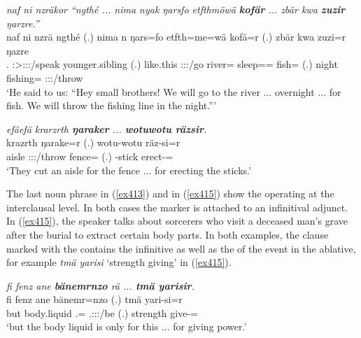 \begin{exe}
	\ex \emph{naf ni nzräkor ``ngthé ... nima nyak ŋarsfo etfthmöwä \textbf{kofär} ... zbär kwa \textbf{zuzir} ŋarzre.''}\\
	\gll naf ni nzrä ngthé (.) nima n ŋars=fo etfth=me=wä kofä=r (.) zbär kwa zuzi=r ŋazre\\
	\Tsg.{\Erg} {\Fnsg} \Stsg:\Sbj>\Fpl:\Obj:\Irr:\Pfv/speak younger.sibling (.) {like.this} \Fpl:\Sbj:\Nonpast:\Ipfv/go river={\All} sleep=\Ins={\Emph} fish={\Purp} (.) night {\Fut} fishing={\Purp} \Fpl:\Sbj:\Nonpast:\Ipfv/throw\\ 
	\trans `He said to us: ``Hey small brothers! We will go to the river ... overnight ... for fish. We will throw the fishing line in the night.'''
	\label{ex414}
\end{exe}
\begin{exe}
	\ex \emph{efäefä krarzrth \textbf{ŋaraker} ... \textbf{wotuwotu räzsir}.}\\
	 krazrth ŋarake=r (.) wotu-wotu räz-si=r\\
	aisle \Stpl:\Sbj:\Irr:\Ipfv/throw fence={\Purp} (.) \Redup-stick erect-\Nmlz=\Purp\\
	\trans `They cut an aisle for the fence ... for erecting the sticks.'
	\label{ex413}
\end{exe}	
	
The last noun phrase in (\ref{ex413}) and in (\ref{ex415}) show the   operating at the interclausal level. In both cases the   marker is attached to an infinitival adjunct. In (\ref{ex415}), the speaker talks about sorcerers who visit a deceased man's grave after the burial to extract certain body parts. In both examples, the clause marked with the  contains the infinitive as well as the  of the event in the ablative, for example \emph{tmä yarisi} `strength giving' in (\ref{ex415}).
	
\begin{exe}
	\ex \emph{fi fenz ane \textbf{bänemrnzo} rä ... \textbf{tmä yarisir}.}\\
	\gll fi fenz ane bänemr=nzo  (.) tmä yari-si=r\\
	but body.liquid {\Dem} \Recog.\Purp={\Only} \Tsg.\F:\Sbj:\Nonpast:\Ipfv/be (.) strength give-\Nmlz={\Purp}\\
	\trans `but the body liquid is only for this ... for giving power.'
	\label{ex415}
\end{exe}

